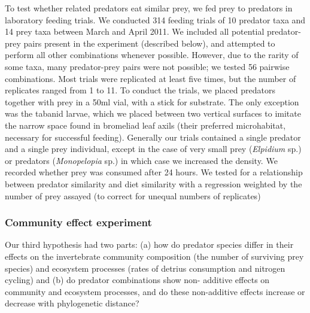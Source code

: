 \documentclass[11pt]{article}
\begin{document}
To test whether related predators eat similar prey, we fed prey to
predators in laboratory feeding trials. We conducted 314 feeding trials
of 10 predator taxa and 14 prey taxa between March and April 2011. We
included all potential predator-prey pairs present in the experiment
(described below), and attempted to perform all other combinations
whenever possible. However, due to the rarity of some taxa, many
predator-prey pairs were not possible; we tested 56 pairwise
combinations. Most trials were replicated at least five times, but the
number of replicates ranged from 1 to 11. To conduct the trials, we
placed predators together with prey in a 50ml vial, with a stick for
substrate. The only exception was the tabanid larvae, which we placed
between two vertical surfaces to imitate the narrow space found in
bromeliad leaf axils (their preferred microhabitat, necessary for
successful feeding). Generally our trials contained a single predator
and a single prey individual, except in the case of very small prey
(\emph{Elpidium} sp.) or predators (\emph{Monopelopia} sp.) in which
case we increased the density. We recorded whether prey was consumed
after 24 hours. We tested for a relationship between predator similarity and diet similarity with a regression weighted by the number of prey assayed (to correct for unequal numbers of replicates)

\subsubsection*{Community effect experiment}

Our third hypothesis had two parts: (a) how do predator species differ
in their effects on the invertebrate community composition (the number of surviving prey species) and ecosystem processes (rates of detrius consumption and nitrogen cycling)
and (b) do predator combinations show non- additive effects on community
and ecosystem processes, and do these non-additive effects increase or
decrease with phylogenetic distance?
\end{document}
